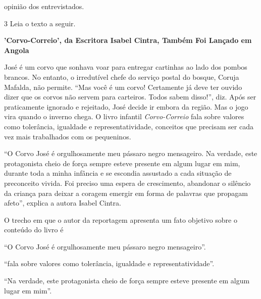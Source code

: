 \begin{conteudo}
\begin{conteudo}
\begin{conteudo}
\begin{conteudo}
\begin{conteudo}
\begin{escolha}
\item opinião dos entrevistados.
\end{escolha}

\pagebreak
\num{3} Leia o texto a seguir.

\begin{myquote}
\textbf{'Corvo-Correio', da Escritora Isabel Cintra, Também Foi Lançado 
em Angola}

José é um corvo que sonhava voar para entregar cartinhas ao lado dos
pombos brancos. No entanto, o irredutível chefe do serviço postal do
bosque, Coruja Mafalda, não permite. ``Mas você é um corvo! Certamente já
deve ter ouvido dizer que os corvos não servem para carteiros. Todos
sabem disso!'', diz. Após ser praticamente ignorado e rejeitado, José
decide ir embora da região. Mas o jogo vira quando o inverno chega. O
livro infantil \textit{Corvo-Correio} fala sobre valores como tolerância,
igualdade e representatividade, conceitos que precisam ser cada vez mais
trabalhados com os pequeninos.

``O Corvo José é orgulhosamente meu pássaro negro mensageiro. Na
verdade, este protagonista cheio de força sempre esteve presente em
algum lugar em mim, durante toda a minha infância e se escondia
assustado a cada situação de preconceito vivida. Foi preciso uma espera
de crescimento, abandonar o silêncio da criança para deixar a coragem
emergir em forma de palavras que propagam afeto'', explica a autora
Isabel Cintra.

\end{myquote}

O trecho em que o autor da reportagem apresenta um fato objetivo sobre
o conteúdo do livro é

\begin{escolha}
\item ``O Corvo José é orgulhosamente meu pássaro negro mensageiro''.

\item ``fala sobre
valores como tolerância, igualdade e representatividade''.

\item ``Na verdade, este protagonista cheio de força sempre esteve
presente em algum lugar em mim''.


\end{escolha}
\end{conteudo}
\end{conteudo}
\end{conteudo}
\end{conteudo}
\end{conteudo}
